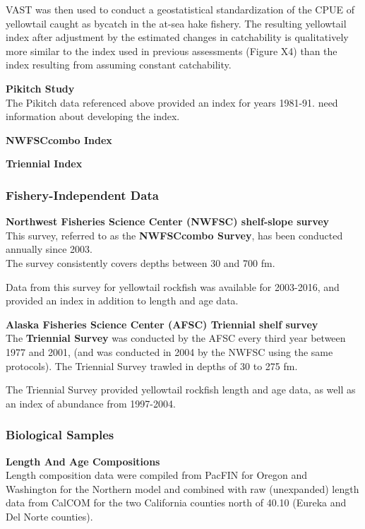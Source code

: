 \documentclass[12pt,]{article}
\begin{document}
VAST was then used to conduct a geostatistical standardization of the
CPUE of yellowtail caught as bycatch in the at-sea hake fishery. The
resulting yellowtail index after adjustment by the estimated changes in
catchability is qualitatively more similar to the index used in previous
assessments (Figure X4) than the index resulting from assuming constant
catchability.

\textbf{Pikitch Study}\\
The Pikitch data referenced above provided an index for years 1981-91.
need information about developing the index.

\textbf{NWFSCcombo Index}

\textbf{Triennial Index}

\subsubsection{Fishery-Independent Data}\label{fishery-independent-data}

\textbf{Northwest Fisheries Science Center (NWFSC) shelf-slope survey}\\
This survey, referred to as the \textbf{NWFSCcombo Survey}, has been
conducted annually since 2003.\\
The survey consistently covers depths between 30 and 700 fm.

Data from this survey for yellowtail rockfish was available for
2003-2016, and provided an index in addition to length and age data.

\textbf{Alaska Fisheries Science Center (AFSC) Triennial shelf survey}\\
The \textbf{Triennial Survey} was conducted by the AFSC every third year
between 1977 and 2001, (and was conducted in 2004 by the NWFSC using the
same protocols). The Triennial Survey trawled in depths of 30 to 275 fm.

The Triennial Survey provided yellowtail rockfish length and age data,
as well as an index of abundance from 1997-2004.

\subsubsection{Biological Samples}\label{biological-samples}

\textbf{Length And Age Compositions}\\
Length composition data were compiled from PacFIN for Oregon and
Washington for the Northern model and combined with raw (unexpanded)
length data from CalCOM for the two California counties north of 40.10
(Eureka and Del Norte counties).
\end{document}
